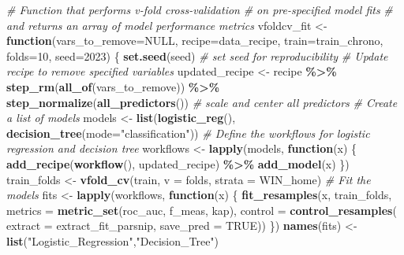 \documentclass[
  12pt,
  a4paper,
]{article}
\newenvironment{Shaded}{\begin{snugshade}}{\end{snugshade}}
\newcommand{\AttributeTok}[1]{\textcolor[rgb]{0.13,0.29,0.53}{#1}}
\newcommand{\CommentTok}[1]{\textcolor[rgb]{0.56,0.35,0.01}{\textit{#1}}}
\newcommand{\ConstantTok}[1]{\textcolor[rgb]{0.56,0.35,0.01}{#1}}
\newcommand{\ControlFlowTok}[1]{\textcolor[rgb]{0.13,0.29,0.53}{\textbf{#1}}}
\newcommand{\DecValTok}[1]{\textcolor[rgb]{0.00,0.00,0.81}{#1}}
\newcommand{\FunctionTok}[1]{\textcolor[rgb]{0.13,0.29,0.53}{\textbf{#1}}}
\newcommand{\NormalTok}[1]{#1}
\newcommand{\OtherTok}[1]{\textcolor[rgb]{0.56,0.35,0.01}{#1}}
\newcommand{\SpecialCharTok}[1]{\textcolor[rgb]{0.81,0.36,0.00}{\textbf{#1}}}
\newcommand{\StringTok}[1]{\textcolor[rgb]{0.31,0.60,0.02}{#1}}
\begin{document}
\begin{Shaded}
\begin{Highlighting}[]
\CommentTok{\# Function that performs v{-}fold cross{-}validation}
\CommentTok{\# on pre{-}specified model fits}
\CommentTok{\# and returns an array of model performance metrics}
\NormalTok{vfoldcv\_fit }\OtherTok{\textless{}{-}} \ControlFlowTok{function}\NormalTok{(}\AttributeTok{vars\_to\_remove=}\ConstantTok{NULL}\NormalTok{, }\AttributeTok{recipe=}\NormalTok{data\_recipe,}
                        \AttributeTok{train=}\NormalTok{train\_chrono, }\AttributeTok{folds=}\DecValTok{10}\NormalTok{, }\AttributeTok{seed=}\DecValTok{2023}\NormalTok{) \{}
  \FunctionTok{set.seed}\NormalTok{(seed) }\CommentTok{\# set seed for reproducibility}
  \CommentTok{\# Update recipe to remove specified variables}
\NormalTok{  updated\_recipe }\OtherTok{\textless{}{-}}\NormalTok{ recipe }\SpecialCharTok{\%\textgreater{}\%}
    \FunctionTok{step\_rm}\NormalTok{(}\FunctionTok{all\_of}\NormalTok{(vars\_to\_remove)) }\SpecialCharTok{\%\textgreater{}\%}
    \FunctionTok{step\_normalize}\NormalTok{(}\FunctionTok{all\_predictors}\NormalTok{()) }\CommentTok{\# scale and center all predictors}
  \CommentTok{\# Create a list of models}
\NormalTok{  models }\OtherTok{\textless{}{-}} \FunctionTok{list}\NormalTok{(}\FunctionTok{logistic\_reg}\NormalTok{(), }\FunctionTok{decision\_tree}\NormalTok{(}\AttributeTok{mode=}\StringTok{"classification"}\NormalTok{))}
  \CommentTok{\# Define the workflows for logistic regression and decision tree}
\NormalTok{  workflows }\OtherTok{\textless{}{-}} \FunctionTok{lapply}\NormalTok{(models, }\ControlFlowTok{function}\NormalTok{(x) \{}
    \FunctionTok{add\_recipe}\NormalTok{(}\FunctionTok{workflow}\NormalTok{(), updated\_recipe) }\SpecialCharTok{\%\textgreater{}\%}
    \FunctionTok{add\_model}\NormalTok{(x)}
\NormalTok{  \})}
\NormalTok{  train\_folds }\OtherTok{\textless{}{-}} \FunctionTok{vfold\_cv}\NormalTok{(train, }\AttributeTok{v =}\NormalTok{ folds, }\AttributeTok{strata =}\NormalTok{ WIN\_home)}
  \CommentTok{\# Fit the models}
\NormalTok{  fits }\OtherTok{\textless{}{-}} \FunctionTok{lapply}\NormalTok{(workflows, }\ControlFlowTok{function}\NormalTok{(x) \{}
    \FunctionTok{fit\_resamples}\NormalTok{(x, train\_folds,}
                  \AttributeTok{metrics =} \FunctionTok{metric\_set}\NormalTok{(roc\_auc, f\_meas, kap),}
                  \AttributeTok{control =} \FunctionTok{control\_resamples}\NormalTok{(}
                    \AttributeTok{extract =}\NormalTok{ extract\_fit\_parsnip, }\AttributeTok{save\_pred =} \ConstantTok{TRUE}\NormalTok{))}
\NormalTok{  \})}
  \FunctionTok{names}\NormalTok{(fits) }\OtherTok{\textless{}{-}} \FunctionTok{list}\NormalTok{(}\StringTok{"Logistic\_Regression"}\NormalTok{,}\StringTok{"Decision\_Tree"}\NormalTok{)}


\end{Highlighting}
\end{Shaded}
\end{document}
